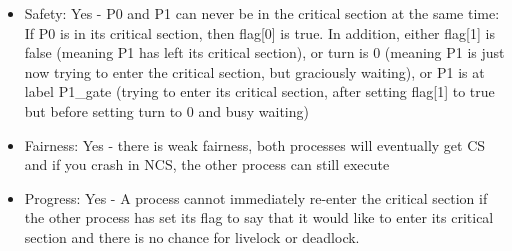 \documentclass{hw}
\begin{document}
\begin{itemize}
  \item Safety: Yes - P0 and P1 can never be in the critical section at the same time:
    If P0 is in its critical section, then flag[0] is true. In addition, either 
    flag[1] is false (meaning P1 has left its critical section), or turn is 0 
    (meaning P1 is just now trying to enter the critical section, but graciously
    waiting), or P1 is at label P1\_gate (trying to enter its critical section,
    after setting flag[1] to true but before setting turn to 0 and busy waiting) 
  \item Fairness: Yes - there is weak fairness, both processes will eventually
    get CS and if you crash in NCS, the other process can still execute
  \item Progress: Yes - A process cannot immediately re-enter the critical 
    section if the other process has set its flag to say that it would like to 
    enter its critical section and there is no chance for livelock or deadlock.
\end{itemize}
\end{document}
